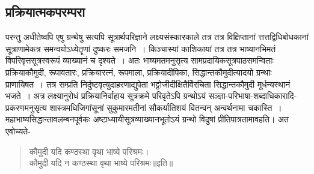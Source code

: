 \subsection*{प्रक्रियात्मकपरम्परा}
परन्तु अधीतेष्वपि एषु ग्रन्थेषु सत्यपि सूत्रार्थपरिज्ञाने लक्ष्यसंस्कारकाले तत्र तत्र विक्षिप्तानां त्तत्तद्विधिबोधकानां सूत्राणामेकत्र समन्वयोऽध्येतॄणां दुष्करः समजनि~। किञ्चास्यां काशिकायां तत्र तत्र भाष्यानभिमतं विपरिवृत्तसूत्रस्वरूपं व्याख्यानं च दृश्यते~। अतः भाष्यमतमनुसृत्य सामप्रदायिकसूत्रपाठसमन्विताः प्रक्रियाकौमुदी, रूपावतारः, प्रक्रियारत्नं, रूपमाला, प्रक्रियादीपिका, सिद्धान्तकौमुदीत्यादयो ग्रन्थाः प्राणायिषत~। तत्र सम्प्रति निर्दुष्टवृत्युदाहरणाद्युपेता भट्टोजीदीक्षितैर्विरचिता सिद्धान्तकौमुदी मूर्धन्यस्थानं भजते~। अत्र लक्ष्यानुरोधं प्रक्रियानिर्वाहाय सूत्रक्रमे परिवृतेऽपि ग्रन्थोऽयं सञ्ज्ञा-परिभाषा-शब्दाधिकारादि-प्रकरणमनुसृत्य शास्त्रमधिजिगांसूनां सुकुमारमतीनां सौकर्यातिशयं वितन्वन् अन्वर्थनामा चकास्ति~। महाभाष्यसिद्धान्तावलम्बनपूर्वकः अष्टाध्यायीसूत्रव्याख्यानभूतोऽयं ग्रन्थो विदुषां प्रीतिपात्रतामावहति। अत एवोच्यते-\\
\vspace{-15pt}
\begin{verse}	 कौमुदी यदि कण्ठस्था वृथा भाष्ये परिश्रमः।\\
	 कौमुदी यदि न कण्ठस्था वृथा भाष्ये परिश्रमः॥इति॥
\end{verse}

